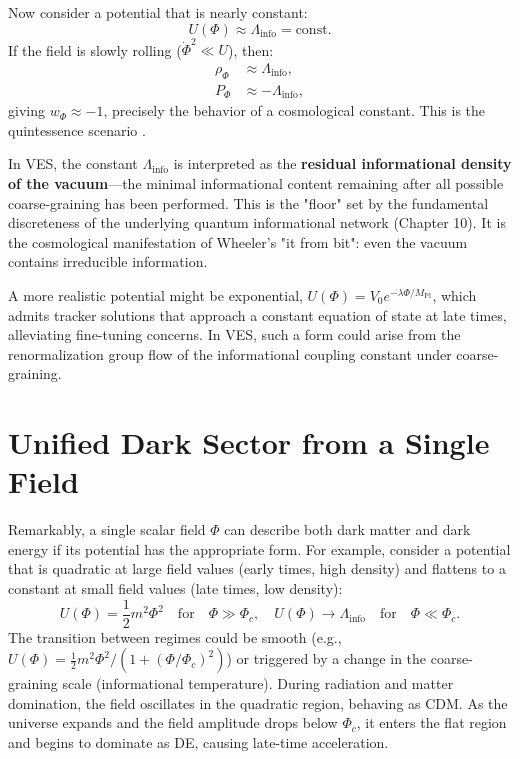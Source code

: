 \documentclass[12pt,a4paper]{book}
\begin{document}
Now consider a potential that is nearly constant:
\begin{equation}
    U(\Phi) \approx \Lambda_{\text{info}} = \text{const}.
\end{equation}
If the field is slowly rolling ($\dot{\Phi}^2 \ll U$), then:
\begin{align}
    \rho_\Phi &\approx \Lambda_{\text{info}}, \\
    P_\Phi &\approx -\Lambda_{\text{info}},
\end{align}
giving $w_\Phi \approx -1$, precisely the behavior of a cosmological constant. This is the quintessence scenario \cite{tsujikawa2013quintessence}.

In VES, the constant $\Lambda_{\text{info}}$ is interpreted as the \textbf{residual informational density of the vacuum}—the minimal informational content remaining after all possible coarse-graining has been performed. This is the "floor" set by the fundamental discreteness of the underlying quantum informational network (Chapter 10). It is the cosmological manifestation of Wheeler's "it from bit": even the vacuum contains irreducible information.

A more realistic potential might be exponential, $U(\Phi) = V_0 e^{-\lambda \Phi/M_{\text{Pl}}}$, which admits tracker solutions that approach a constant equation of state at late times, alleviating fine-tuning concerns. In VES, such a form could arise from the renormalization group flow of the informational coupling constant under coarse-graining.

\section{Unified Dark Sector from a Single Field}

Remarkably, a single scalar field $\Phi$ can describe both dark matter and dark energy if its potential has the appropriate form. For example, consider a potential that is quadratic at large field values (early times, high density) and flattens to a constant at small field values (late times, low density):
\begin{equation}
    U(\Phi) = \frac12 m^2 \Phi^2 \quad \text{for} \quad \Phi \gg \Phi_c, \quad U(\Phi) \rightarrow \Lambda_{\text{info}} \quad \text{for} \quad \Phi \ll \Phi_c.
\end{equation}
The transition between regimes could be smooth (e.g., $U(\Phi) = \frac12 m^2 \Phi^2 / (1 + (\Phi/\Phi_c)^2)$) or triggered by a change in the coarse-graining scale (informational temperature). During radiation and matter domination, the field oscillates in the quadratic region, behaving as CDM. As the universe expands and the field amplitude drops below $\Phi_c$, it enters the flat region and begins to dominate as DE, causing late-time acceleration.
\end{document}
